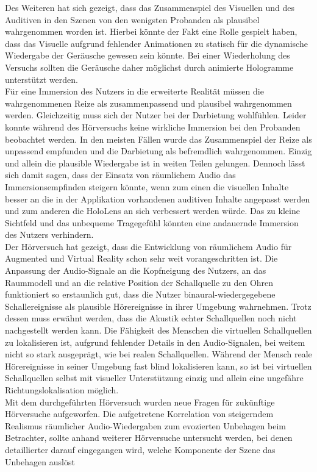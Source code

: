 Des Weiteren hat sich gezeigt, dass das Zusammenspiel des Visuellen und des Auditiven in den Szenen von den wenigsten Probanden als plausibel wahrgenommen worden ist. Hierbei könnte der Fakt eine Rolle gespielt haben, dass das Visuelle aufgrund fehlender Animationen zu statisch für die dynamische Wiedergabe der Geräusche gewesen sein könnte. Bei einer Wiederholung des Versuchs sollten die Geräusche daher möglichst durch animierte Hologramme unterstützt werden. \\

Für eine Immersion des Nutzers in die erweiterte Realität müssen die wahrgenommenen Reize als zusammenpassend und plausibel wahrgenommen werden. Gleichzeitig muss sich der Nutzer bei der Darbietung wohlfühlen. Leider konnte während des Hörversuchs keine wirkliche Immersion bei den Probanden beobachtet werden. In den meisten Fällen wurde das Zusammenspiel der Reize als unpassend empfunden und die Darbietung als befremdlich wahrgenommen. Einzig und allein die plausible Wiedergabe ist in weiten Teilen gelungen. Dennoch lässt sich damit sagen, dass der Einsatz von räumlichem Audio das Immersionsempfinden steigern könnte, wenn zum einen die visuellen Inhalte besser an die in der Applikation vorhandenen auditiven Inhalte angepasst werden und zum anderen die HoloLens an sich verbessert werden würde. Das zu kleine Sichtfeld und das unbequeme Tragegefühl könnten eine andauernde Immersion des Nutzers verhindern. \\

Der Hörversuch hat gezeigt, dass die Entwicklung von räumlichem Audio für Augmented und Virtual Reality schon sehr weit vorangeschritten ist. Die Anpassung der Audio-Signale an die Kopfneigung des Nutzers, an das Raummodell und an die relative Position der Schallquelle zu den Ohren funktioniert so erstaunlich gut, dass die Nutzer binaural-wiedergegebene Schallereignisse als plausible Hörereignisse in ihrer Umgebung wahrnehmen. Trotz dessen muss erwähnt werden, dass die Akustik echter Schallquellen noch nicht nachgestellt werden kann.
Die Fähigkeit des Menschen die virtuellen Schallquellen zu lokalisieren ist, aufgrund fehlender Details in den Audio-Signalen, bei weitem nicht so stark ausgeprägt, wie bei realen Schallquellen. Während der Mensch reale Hörereignisse in seiner Umgebung fast blind lokalisieren kann, so ist bei virtuellen Schallquellen selbst mit visueller Unterstützung  einzig und allein eine ungefähre Richtungslokalisation möglich. \\

Mit dem durchgeführten Hörversuch wurden neue Fragen für zukünftige Hörversuche aufgeworfen. Die aufgetretene Korrelation von steigerndem Realismus räumlicher Audio-Wiedergaben zum evozierten Unbehagen beim Betrachter, sollte anhand weiterer Hörversuche untersucht werden, bei denen detaillierter darauf eingegangen wird, welche Komponente der Szene das Unbehagen auslöst \\

